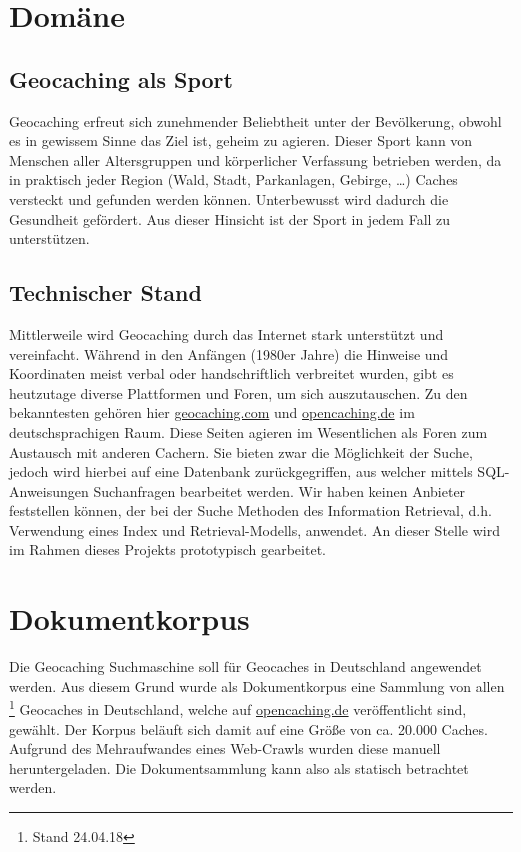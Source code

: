 \documentclass[11pt,a4paper]{scrreprt}
\begin{document}
\section{Domäne}
\subsection{Geocaching als Sport}
Geocaching erfreut sich zunehmender Beliebtheit unter der Bevölkerung, obwohl es in gewissem Sinne das Ziel ist, geheim zu agieren. Dieser Sport kann von Menschen aller Altersgruppen und körperlicher Verfassung betrieben werden, da in praktisch jeder Region (Wald, Stadt, Parkanlagen, Gebirge, \dots) Caches versteckt und gefunden werden können. Unterbewusst wird dadurch die Gesundheit gefördert. Aus dieser Hinsicht ist der Sport in jedem Fall zu unterstützen. 

\subsection{Technischer Stand}
Mittlerweile wird Geocaching durch das Internet stark unterstützt und vereinfacht. Während in den Anfängen (1980er Jahre) die Hinweise und Koordinaten meist verbal oder handschriftlich verbreitet wurden, gibt es heutzutage diverse Plattformen und Foren, um sich auszutauschen. Zu den bekanntesten gehören hier \href{geocaching.com}{geocaching.com} und \href{opencaching.de}{opencaching.de} im deutschsprachigen Raum. Diese Seiten agieren im Wesentlichen als Foren zum Austausch mit anderen Cachern. Sie bieten zwar die Möglichkeit der Suche, jedoch wird hierbei auf eine Datenbank zurückgegriffen, aus welcher mittels SQL-Anweisungen Suchanfragen bearbeitet werden. Wir haben keinen Anbieter feststellen können, der bei der Suche Methoden des Information Retrieval, d.h. Verwendung eines Index und Retrieval-Modells, anwendet. An dieser Stelle wird im Rahmen dieses Projekts prototypisch gearbeitet. 

\section{Dokumentkorpus}
Die Geocaching Suchmaschine soll für Geocaches in Deutschland angewendet werden. Aus diesem Grund wurde als Dokumentkorpus eine Sammlung von allen \footnote{Stand 24.04.18} Geocaches in Deutschland, welche auf \href{opencaching.de}{opencaching.de} veröffentlicht sind, gewählt. Der Korpus beläuft sich damit auf eine Größe von ca. 20.000 Caches. Aufgrund des Mehraufwandes eines Web-Crawls wurden diese manuell heruntergeladen. Die Dokumentsammlung kann also als statisch betrachtet werden. 
\end{document}

